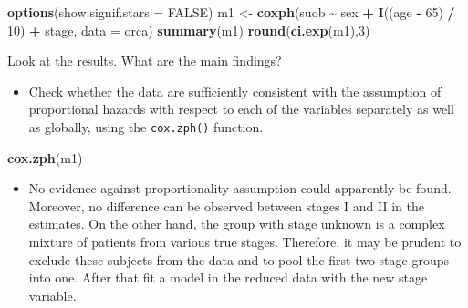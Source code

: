 \documentclass[
]{book}
\newenvironment{Shaded}{\begin{snugshade}}{\end{snugshade}}
\newcommand{\AttributeTok}[1]{\textcolor[rgb]{0.13,0.29,0.53}{#1}}
\newcommand{\ConstantTok}[1]{\textcolor[rgb]{0.56,0.35,0.01}{#1}}
\newcommand{\DecValTok}[1]{\textcolor[rgb]{0.00,0.00,0.81}{#1}}
\newcommand{\FunctionTok}[1]{\textcolor[rgb]{0.13,0.29,0.53}{\textbf{#1}}}
\newcommand{\NormalTok}[1]{#1}
\newcommand{\OtherTok}[1]{\textcolor[rgb]{0.56,0.35,0.01}{#1}}
\newcommand{\SpecialCharTok}[1]{\textcolor[rgb]{0.81,0.36,0.00}{\textbf{#1}}}
\providecommand{\tightlist}{%
  \setlength{\itemsep}{0pt}\setlength{\parskip}{0pt}}
\begin{document}
\begin{Shaded}
\begin{Highlighting}[]
\FunctionTok{options}\NormalTok{(}\AttributeTok{show.signif.stars =} \ConstantTok{FALSE}\NormalTok{)}
\NormalTok{m1 }\OtherTok{\textless{}{-}} \FunctionTok{coxph}\NormalTok{(suob }\SpecialCharTok{\textasciitilde{}}\NormalTok{ sex }\SpecialCharTok{+} \FunctionTok{I}\NormalTok{((age }\SpecialCharTok{{-}} \DecValTok{65}\NormalTok{) }\SpecialCharTok{/} \DecValTok{10}\NormalTok{) }\SpecialCharTok{+}\NormalTok{ stage, }\AttributeTok{data =}\NormalTok{ orca)}
\FunctionTok{summary}\NormalTok{(m1)}
\FunctionTok{round}\NormalTok{(}\FunctionTok{ci.exp}\NormalTok{(m1),}\DecValTok{3}\NormalTok{)}
\end{Highlighting}
\end{Shaded}

Look at the results. What are the main findings?

\begin{itemize}
\tightlist
\item
  Check whether the data are sufficiently consistent with the
  assumption of proportional hazards with respect to each of
  the variables separately
  as well as globally, using the \texttt{cox.zph()} function.
\end{itemize}

\begin{Shaded}
\begin{Highlighting}[]
\FunctionTok{cox.zph}\NormalTok{(m1)}
\end{Highlighting}
\end{Shaded}

\begin{itemize}
\tightlist
\item
  No evidence against proportionality assumption could apparently be found.
  Moreover, no difference can be observed between stages I and II in the estimates.
  On the other hand, the
  group with stage unknown is a complex mixture of patients from various
  true stages. Therefore, it may be prudent to exclude these subjects from the data
  and to pool the first two stage groups into one. After that fit a model in
  the reduced data with the new stage variable.
\end{itemize}
\end{document}
